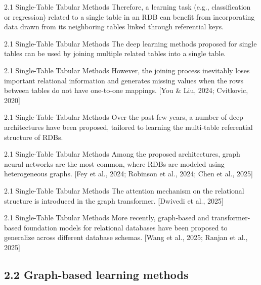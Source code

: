 \documentclass[aspectratio=169,10pt]{beamer}
\newcommand{\cit}[1]{{\scriptsize\color{gray}[#1]}}
\begin{document}
\begin{frame}{2.1 Single-Table Tabular Methods}
Therefore, a learning task (e.g., classification or regression) related to a single table in an RDB can benefit from incorporating data drawn from its neighboring tables linked through referential keys.
\end{frame}

\begin{frame}{2.1 Single-Table Tabular Methods}
The deep learning methods proposed for single tables can be used by joining multiple related tables into a single table.
\end{frame}

\begin{frame}{2.1 Single-Table Tabular Methods}
However, the joining process inevitably loses important relational information and generates missing values when the rows between tables do not have one-to-one mappings.
\cit{You \& Liu, 2024; Cvitkovic, 2020}
\end{frame}

\begin{frame}{2.1 Single-Table Tabular Methods}
Over the past few years, a number of deep architectures have been proposed, tailored to learning the multi-table referential structure of RDBs.
\end{frame}

\begin{frame}{2.1 Single-Table Tabular Methods}
Among the proposed architectures, graph neural networks are the most common, where RDBs are modeled using heterogeneous graphs.
\cit{Fey et al., 2024; Robinson et al., 2024; Chen et al., 2025}
\end{frame}

\begin{frame}{2.1 Single-Table Tabular Methods}
The attention mechanism on the relational structure is introduced in the graph transformer.
\cit{Dwivedi et al., 2025}
\end{frame}

\begin{frame}{2.1 Single-Table Tabular Methods}
More recently, graph-based and transformer-based foundation models for relational databases have been proposed to generalize across different database schemas.
\cit{Wang et al., 2025; Ranjan et al., 2025}
\end{frame}

\subsection{2.2 Graph-based learning methods}
\end{document}

